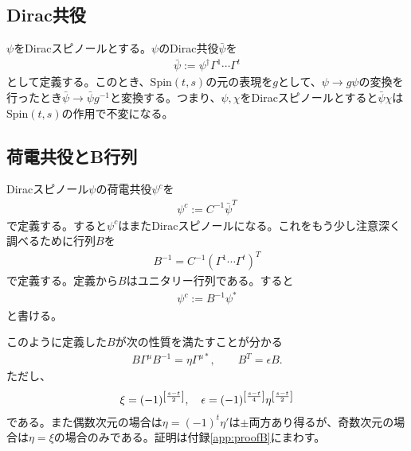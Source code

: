 \documentclass[12pt,a4paper,dvipdfmx]{jlreq}
\begin{document}
\subsection{Dirac共役}
$\psi$をDiracスピノールとする。$\psi$のDirac共役$\bar{\psi}$を
\begin{align*}
  \bar{\psi}:=\psi^{\dag}\Gamma^{1}\cdots \Gamma^{t}
\end{align*}
として定義する。このとき、Spin$(t,s)$の元の表現を$g$として、$\psi\to g\psi$の変換を行ったとき$\bar{\psi}\to \bar{\psi}g^{-1}$と変換する。つまり、$\psi,\chi$をDiracスピノールとすると$\bar{\psi}\chi$はSpin$(t,s)$の作用で不変になる。

\subsection{荷電共役とB行列}
Diracスピノール$\psi$の荷電共役$\psi^c$を
\begin{align}
  \psi^{c}:=C^{-1}\bar{\psi}^T
\end{align}
で定義する。すると$\psi^{c}$はまたDiracスピノールになる。これをもう少し注意深く調べるために行列$B$を
\begin{align}
  B^{-1}=C^{-1} (\Gamma^{1}\cdots \Gamma^{t})^T
  \label{defB}
\end{align}
で定義する。定義から$B$はユニタリー行列である。すると
\begin{align*}
  \psi^{c}:=B^{-1}\psi^{*}
\end{align*}
と書ける。

このように定義した$B$が次の性質を満たすことが分かる
\begin{align}
  B\Gamma^{\mu}B^{-1}=\eta \Gamma^{\mu*},\qquad B^T=\epsilon B.\label{B-properties1}
\end{align}
ただし、
\begin{align}
  \xi=(-1)^{\qty[\frac{s-t}{2}]},\quad
  \epsilon=(-1)^{\qty[\frac{s-t}{4}]}\eta^{\qty[\frac{s-t}{2}]}
  \label{B-signs}
\end{align}
である。また偶数次元の場合は$\eta=(-1)^{t}\eta'$は$\pm$両方あり得るが、奇数次元の場合は$\eta=\xi$の場合のみである。証明は付録\ref{app:proofB}にまわす。
\end{document}
